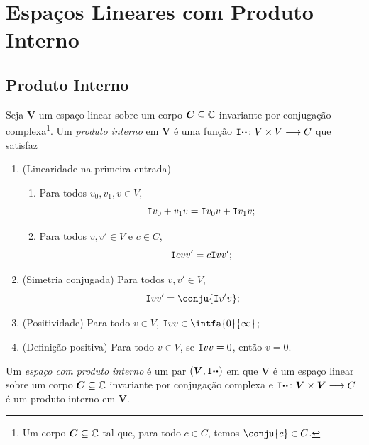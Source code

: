 \chapter{Espaços Lineares com Produto Interno}

\section{Produto Interno}

\begin{defi}
Seja $\bm V$ um espaço linear sobre um corpo $\bm C \subseteq \mathbb{C}$ invariante por conjugação complexa\footnote{Um corpo $\bm C \subseteq \mathbb{C}$ tal que, para todo $c \in C$, temos $\conju{c} \in C$.}. Um \emph{produto interno} em $\bm V$ é uma função $\mathtt I{\bm{\cdot}}{\bm{\cdot}}\colon V \times V \longrightarrow C$ que satisfaz
	\begin{enumerate}
	\item (Linearidade na primeira entrada)
		\begin{enumerate}
		\item Para todos $v_0,v_1,v \in V$,
			\begin{equation*}
			\mathtt I{v_0+v_1}{v} = \mathtt I{v_0}{v} + \mathtt I{v_1}{v};
			\end{equation*}
		\item Para todos $v,v' \in V$ e $c \in C$,
			\begin{equation*}
			\mathtt I{cv}{v'} = c\mathtt I{v}{v'};
			\end{equation*}
		\end{enumerate}
	\item (Simetria conjugada) Para todos $v,v' \in V$,
		\begin{equation*}
		\inte{v}{v'} = \conju{\inte{v'}{v}};
		\end{equation*}
	\item (Positividade) Para todo $v \in V$, $\inte{v}{v} \in \intfa{0}{\infty}$;
	\item (Definição positiva) Para todo $v \in V$, se $\mathtt I{v}{v}=0$, então $v=0$.
		\end{enumerate}
\end{defi}

\begin{defi}
Um \emph{espaço com produto interno} é um par $(\bm V,\mathtt I{\bm{\cdot}}{\bm{\cdot}})$ em que $\bm V$ é um espaço linear sobre um corpo $\bm C \subseteq \mathbb{C}$ invariante por conjugação complexa e $\mathtt I{\bm{\cdot}}{\bm{\cdot}}\colon \bm V \times \bm V \longrightarrow C$ é um produto interno em $\bm V$.
\end{defi}

